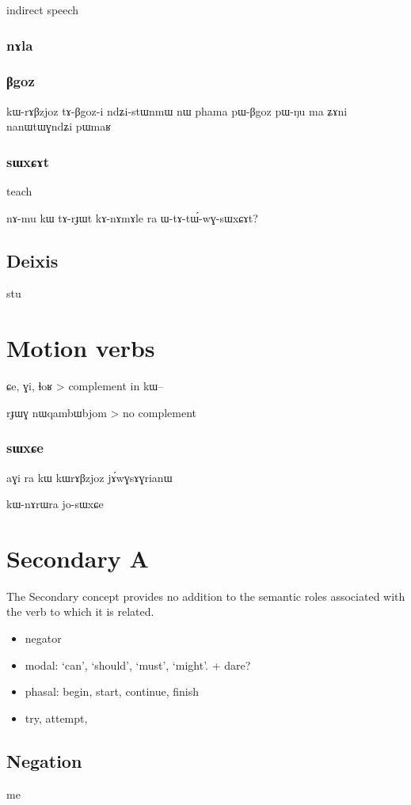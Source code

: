\documentclass[oldfontcommands,oneside,a4paper,11pt]{article}
\newcommand{\ipa}[1]{{\phon #1}} %
\begin{document}
  indirect speech
 \subsubsection{nɤla}
 
\subsubsection{βgoz}
kɯ-rɤβzjoz tɤ-βgoz-i
 ndʑi-stɯnmɯ nɯ phama pɯ-βgoz pɯ-ŋu ma ʑɤni nanɯtɯɣndʑi pɯmaʁ
 
\subsubsection{sɯxɕɤt} 
teach

 nɤ-mu kɯ tɤ-rɟɯt kɤ-nɤmɤle ra   ɯ-tɤ-tɯ́-wɣ-sɯxɕɤt?
\subsection{Deixis}
 stu
 
 \section{Motion verbs}
 
 \citealt{jacques13harmonization}
\ipa{ɕe}, \ipa{ɣi}, \ipa{ɬoʁ} > complement in \ipa{kɯ--}
 
 
 \ipa{rɟɯɣ} \ipa{nɯqambɯbjom} > no complement
 \subsubsection{sɯxɕe}
 aɣi ra kɯ kɯrɤβzjoz jɤ́wɣsɤɣrianɯ
 
 
 kɯ-nɤrɯra jo-sɯxɕe
 \section{Secondary A} 
  The Secondary concept provides no addition to the semantic roles associated with the verb to which it is related.
   \begin{itemize}
\item negator
\item modal: ‘can’, ‘should’, ‘must’, ‘might’. + dare?
\item phasal: begin, start, continue, finish
\item try, attempt,  
\end{itemize}

  \subsection{Negation}
  me
  
\end{document}
